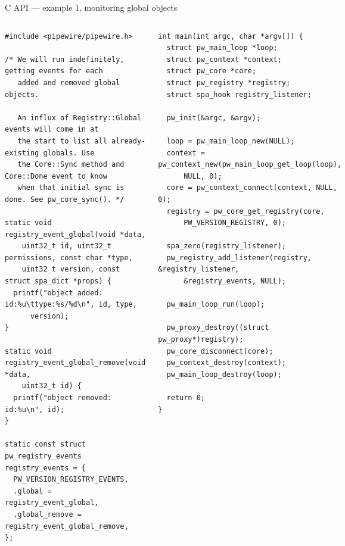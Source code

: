 \begin{frame}[fragile]{C API — example 1, monitoring global objects}

  \begin{columns}

      \begin{block}{}
        \fontsize{7}{7}\selectfont
          \begin{verbatim}
#include <pipewire/pipewire.h>

/* We will run indefinitely, getting events for each
   added and removed global objects.

   An influx of Registry::Global events will come in at
   the start to list all already-existing globals. Use
   the Core::Sync method and Core::Done event to know
   when that initial sync is done. See pw_core_sync(). */

static void registry_event_global(void *data,
    uint32_t id, uint32_t permissions, const char *type,
    uint32_t version, const struct spa_dict *props) {
  printf("object added: id:%u\ttype:%s/%d\n", id, type,
      version);
}

static void registry_event_global_remove(void *data,
    uint32_t id) {
  printf("object removed: id:%u\n", id);
}

static const struct pw_registry_events registry_events = {
  PW_VERSION_REGISTRY_EVENTS,
  .global = registry_event_global,
  .global_remove = registry_event_global_remove,
};
          \end{verbatim}
        \end{block}

      \begin{block}{}
        \fontsize{7}{7}\selectfont
          \begin{verbatim}
int main(int argc, char *argv[]) {
  struct pw_main_loop *loop;
  struct pw_context *context;
  struct pw_core *core;
  struct pw_registry *registry;
  struct spa_hook registry_listener;

  pw_init(&argc, &argv);

  loop = pw_main_loop_new(NULL);
  context = pw_context_new(pw_main_loop_get_loop(loop),
      NULL, 0);
  core = pw_context_connect(context, NULL, 0);
  registry = pw_core_get_registry(core,
      PW_VERSION_REGISTRY, 0);

  spa_zero(registry_listener);
  pw_registry_add_listener(registry, &registry_listener,
      &registry_events, NULL);

  pw_main_loop_run(loop);

  pw_proxy_destroy((struct pw_proxy*)registry);
  pw_core_disconnect(core);
  pw_context_destroy(context);
  pw_main_loop_destroy(loop);

  return 0;
}
          \end{verbatim}
        \end{block}

  \end{columns}
\end{frame}




